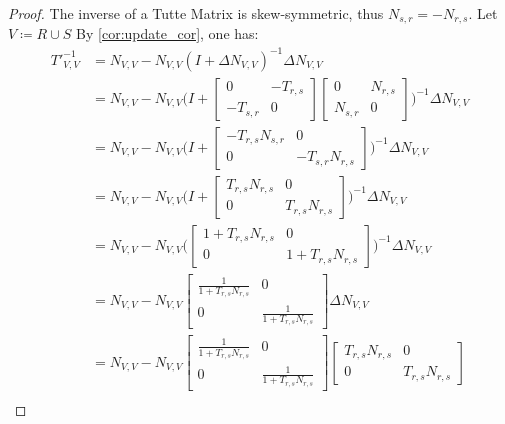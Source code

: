 \begin{proof}
    The inverse of a Tutte Matrix is skew-symmetric, thus \(N_{s, r} = -N_{r, s}\).
    Let \(V \coloneqq R \cup S\)
    By \cref{cor:update_cor}, one has:
    \begin{align*}
        {T'}^{-1}_{V, V} &= N_{V, V} - N_{V, V} (I + \Delta N_{V, V})^{-1} \Delta N_{V, V} \\
        &= N_{V, V} - N_{V, V} \bigg(I + \begin{bmatrix} 0 & -T_{r, s} \\ -T_{s, r} & 0 \end{bmatrix} \begin{bmatrix} 0 & N_{r, s} \\ N_{s, r} & 0 \end{bmatrix}\bigg)^{-1} \Delta N_{V, V} \\
        &= N_{V, V} - N_{V, V} \bigg(I + \begin{bmatrix} -T_{r, s} N_{s, r} & 0 \\ 0 & -T_{s, r} N_{r, s} \end{bmatrix} \bigg)^{-1} \Delta N_{V, V} \\
        &= N_{V, V} - N_{V, V} \bigg(I + \begin{bmatrix} T_{r, s} N_{r, s} & 0 \\ 0 & T_{r, s} N_{r, s} \end{bmatrix} \bigg)^{-1} \Delta N_{V, V} \\
        &= N_{V, V} - N_{V, V} \bigg(\begin{bmatrix} 1 + T_{r, s} N_{r, s} & 0 \\ 0 & 1 + T_{r, s} N_{r, s} \end{bmatrix} \bigg)^{-1} \Delta N_{V, V} \\
        &= N_{V, V} - N_{V, V} \begin{bmatrix} \frac{1}{1 + T_{r, s} N_{r, s}} & 0 \\ 0 & \frac{1}{1 + T_{r, s} N_{r, s}} \end{bmatrix} \Delta N_{V, V} \\
        &= N_{V, V} - N_{V, V} \begin{bmatrix} \frac{1}{1 + T_{r, s} N_{r, s}} & 0 \\ 0 & \frac{1}{1 + T_{r, s} N_{r, s}} \end{bmatrix} \begin{bmatrix} T_{r, s} N_{r, s} & 0 \\ 0 & T_{r, s} N_{r, s} \end{bmatrix} \\

\end{align*}
\end{proof}
